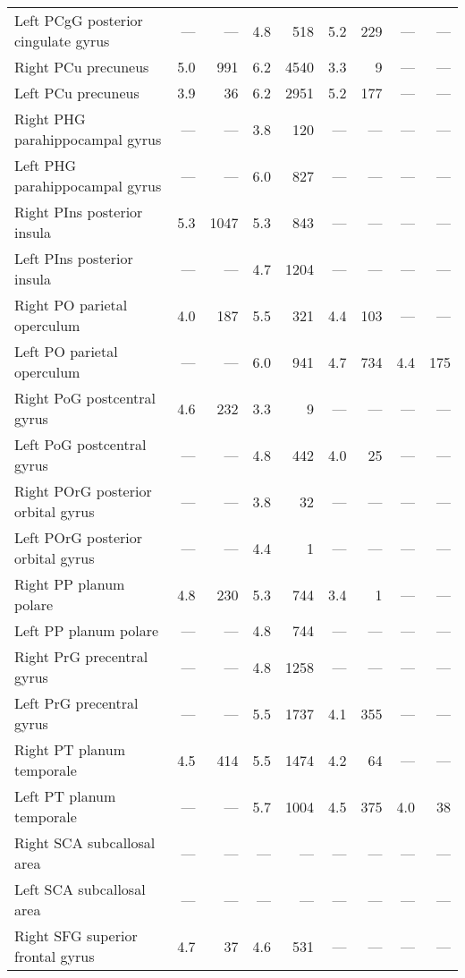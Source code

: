 \documentclass[]{article}
\begin{document}
\begin{table}[ht]
{\begin{tabular}{lrrrrrrrr}
  Left PCgG  posterior cingulate gyrus & --- & --- & 4.8 & 518 & 5.2 & 229 & --- & --- \\ 
  Right PCu   precuneus & 5.0 & 991 & 6.2 & 4540 & 3.3 & 9 & --- & --- \\ 
  Left PCu   precuneus & 3.9 & 36 & 6.2 & 2951 & 5.2 & 177 & --- & --- \\ 
  Right PHG   parahippocampal gyrus & --- & --- & 3.8 & 120 & --- & --- & --- & --- \\ 
  Left PHG   parahippocampal gyrus & --- & --- & 6.0 & 827 & --- & --- & --- & --- \\ 
  Right PIns  posterior insula & 5.3 & 1047 & 5.3 & 843 & --- & --- & --- & --- \\ 
  Left PIns  posterior insula & --- & --- & 4.7 & 1204 & --- & --- & --- & --- \\ 
  Right PO    parietal operculum & 4.0 & 187 & 5.5 & 321 & 4.4 & 103 & --- & --- \\ 
  Left PO    parietal operculum & --- & --- & 6.0 & 941 & 4.7 & 734 & 4.4 & 175 \\ 
  Right PoG   postcentral gyrus & 4.6 & 232 & 3.3 & 9 & --- & --- & --- & --- \\ 
  Left PoG   postcentral gyrus & --- & --- & 4.8 & 442 & 4.0 & 25 & --- & --- \\ 
  Right POrG  posterior orbital gyrus & --- & --- & 3.8 & 32 & --- & --- & --- & --- \\ 
  Left POrG  posterior orbital gyrus & --- & --- & 4.4 & 1 & --- & --- & --- & --- \\ 
  Right PP    planum polare & 4.8 & 230 & 5.3 & 744 & 3.4 & 1 & --- & --- \\ 
  Left PP    planum polare & --- & --- & 4.8 & 744 & --- & --- & --- & --- \\ 
  Right PrG   precentral gyrus & --- & --- & 4.8 & 1258 & --- & --- & --- & --- \\ 
  Left PrG   precentral gyrus & --- & --- & 5.5 & 1737 & 4.1 & 355 & --- & --- \\ 
  Right PT    planum temporale & 4.5 & 414 & 5.5 & 1474 & 4.2 & 64 & --- & --- \\ 
  Left PT    planum temporale & --- & --- & 5.7 & 1004 & 4.5 & 375 & 4.0 & 38 \\ 
  Right SCA   subcallosal area & --- & --- & --- & --- & --- & --- & --- & --- \\ 
  Left SCA   subcallosal area & --- & --- & --- & --- & --- & --- & --- & --- \\ 
  Right SFG   superior frontal gyrus & 4.7 & 37 & 4.6 & 531 & --- & --- & --- & --- \\ 

\end{tabular}}
\end{table}
\end{document}
